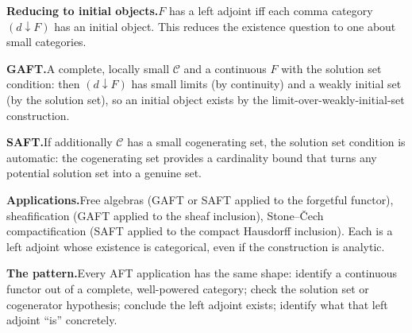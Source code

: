 \begin{exercisesbox}
\begin{qa}
\end{qa}
\end{exercisesbox}


\begin{summarybox}
\textbf{Reducing to initial objects.}\quad $F$ has a left adjoint iff
each comma category $(d \downarrow F)$ has an initial object. This
reduces the existence question to one about small categories.

\textbf{GAFT.}\quad A complete, locally small $\mathcal{C}$ and a
continuous $F$ with the solution set condition: then $(d \downarrow F)$
has small limits (by continuity) and a weakly initial set (by the solution
set), so an initial object exists by the limit-over-weakly-initial-set
construction.

\textbf{SAFT.}\quad If additionally $\mathcal{C}$ has a small cogenerating
set, the solution set condition is automatic: the cogenerating set provides
a cardinality bound that turns any potential solution set into a genuine
set.

\textbf{Applications.}\quad Free algebras (GAFT or SAFT applied to the
forgetful functor), sheafification (GAFT applied to the sheaf inclusion),
Stone--\v{C}ech compactification (SAFT applied to the compact Hausdorff
inclusion). Each is a left adjoint whose existence is categorical, even
if the construction is analytic.

\textbf{The pattern.}\quad Every AFT application has the same shape:
identify a continuous functor out of a complete, well-powered category;
check the solution set or cogenerator hypothesis; conclude the left
adjoint exists; identify what that left adjoint ``is'' concretely.
\end{summarybox}



